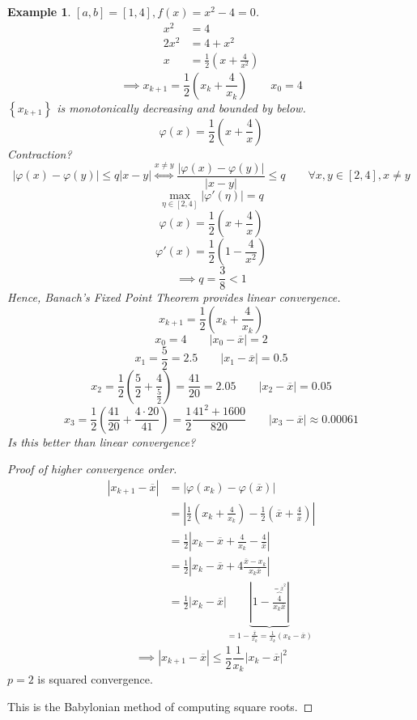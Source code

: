 \documentclass{article}
\newtheorem{example}{Example}
\newcommand{\set}[1]{\left\{#1\right\}}
\newcommand{\card}[1]{\left|#1\right|}
\begin{document}
\begin{example}
  $[a,b] = [1,4], f(x) = x^2 - 4 = 0$.
  \begin{align*}
    x^2 &= 4 \\
    2x^2 &= 4 + x^2 \\
    x &= \frac12 \left(x + \frac4{x^2}\right)
  \end{align*}
  \[ \implies x_{k+1} = \frac12 \left(x_k + \frac{4}{x_k}\right) \qquad x_0 = 4 \]
  $\set{x_{k+1}}$ is monotonically decreasing and bounded by below.
  \[ \varphi(x) = \frac12 \left(x + \frac4x\right) \]
  Contraction?
  \[ \card{\varphi(x) - \varphi(y)} \leq q \card{x - y} \stackrel{x \neq y}{\iff} \frac{\card{\varphi(x) - \varphi(y)}}{\card{x - y}} \leq q \qquad \forall x,y \in [2,4], x \neq y \]
  \[ \max_{\eta \in [2,4]} \card{\varphi'(\eta)} = q \]
  \[ \varphi(x) = \frac12 \left(x + \frac4x\right) \]
  \[ \varphi'(x) = \frac12 \left(1 - \frac4{x^2}\right) \]
  \[ \implies q = \frac38 < 1 \]
  Hence, Banach's Fixed Point Theorem provides linear convergence.
  \[ x_{k+1} = \frac12 \left(x_k + \frac4{x_k} \right) \]
  \[ x_0 = 4 \qquad \card{x_0 - \overline x} = 2 \]
  \[ x_1 = \frac52 = 2.5 \qquad \card{x_1 - \overline x} = 0.5 \]
  \[ x_2 = \frac12 \left(\frac52 + \frac4{\frac52}\right) = \frac{41}{20} = 2.05 \qquad \card{x_2 - \overline x} = 0.05 \]
  \[ x_3 = \frac12 \left(\frac{41}{20} + \frac{4\cdot20}{41}\right) = \frac12 \frac{41^2 + 1600}{820} \qquad \card{x_3 - \overline x} \approx 0.00061 \]
  Is this better than linear convergence?
\end{example}

\begin{proof}[Proof of higher convergence order]
  \begin{align*}
    \card{x_{k+1} - \overline x}
      &= \card{\varphi(x_k) - \varphi(\overline x)} \\
      &= \card{\frac12 \left(x_k + \frac4{x_k}\right) - \frac12 \left(\overline x + \frac4{\overline x}\right)} \\
      &= \frac12 \card{x_k - \overline x + \frac4{x_k} - \frac4{\overline x}} \\
      &= \frac12 \card{x_k - \overline x + 4 \frac{\overline x - x_k}{x_k \overline x}} \\
      &= \frac12 \card{x_k - \overline x} \underbrace{\card{1 - \frac{\overbrace{4}^{=\overline x^2}}{x_k \overline x}}}_{= 1 - \frac{\overline x}{x_k} = \frac1{x_k}\left(x_k - \overline x\right)}
  \end{align*}
  \[ \implies \card{x_{k+1} - \overline x} \leq \frac12 \frac{1}{x_k} \card{x_k - \overline x}^2 \]
  $p=2$ is squared convergence.

  This is the Babylonian method of computing square roots.
\end{proof}
\end{document}
